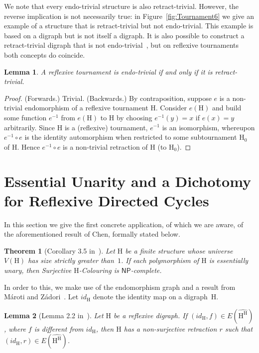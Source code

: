 \documentclass[a4paper,12pt]{article}
\newtheorem{lemma}{Lemma}
\newtheorem{theorem}{Theorem}
\theoremstyle{remark}
\newcommand{\NP}[0]{\ensuremath{\mathsf{NP}}}
\renewcommand{\H}{\ensuremath{\mathrm{H}}}
\begin{document}
We note that every endo-trivial structure is also retract-trivial. However, the reverse implication is not necessarily true: 
in Figure~\ref{fig:Tournament6} we give an example of a structure that is retract-trivial but not endo-trivial.
This example is based on a digraph but is not itself a digraph. It is also possible to construct a retract-trivial digraph that is not endo-trivial~\cite{Si17}, but
on reflexive tournaments both concepts do coincide.

\begin{lemma}
A reflexive tournament is endo-trivial if and only if it is retract-trivial.
\label{lem:endo-retraction-trivial}
\end{lemma}

\begin{proof}
(Forwards.) Trivial.
(Backwards.) By contraposition, suppose $e$ is a non-trivial endomorphism of a reflexive tournament $\H$. Consider $e(\H)$ and build some function $e^{-1}$ from $e(\H)$ to $\H$ by choosing $e^{-1}(y)=x$ if $e(x)=y$ arbitrarily. Since $\H$ is a (reflexive) tournament, $e^{-1}$ is an isomorphism, whereupon $e^{-1} \circ e$ is the identity automorphism when restricted to some subtournament $\H_0$ of $\H$. Hence $e^{-1} \circ e$ is a non-trivial retraction of $\H$ (to $\H_0$).
\end{proof}

\section{Essential Unarity and a Dichotomy for Reflexive Directed Cycles}\label{sec:Benoit}

In this section we give the first concrete application, of which we are aware, of the aforementioned result of Chen, formally stated below.

\begin{theorem}[Corollary 3.5 in~\cite{ChenSurHom}]
Let $\H$ be a finite structure whose universe $V(\H)$ has size strictly greater than~$1$. If each
polymorphism of $\H$ is essentially unary, then {\sc Surjective $\H$-Colouring}
is \NP-complete.
\label{thm:Chen-hauptsatz}
\end{theorem}

In order to this, we make use of the endomorphism graph and a result from M\'aroti and Z\'adori~\cite{marzad}.
Let $id_\H$ denote the identity map on a digraph~$\H$.

\begin{lemma}[Lemma 2.2 in~\cite{marzad}] Let $\H$ be a reflexive digraph. If $(id_\H,f) \in E(\widehat{\H^\H})$, where $f$ is different from
$id_\H$, then $\H$ has a
non-surjective retraction $r$ 
 such that $(id_\H,r)\in E(\widehat{\H^{\H}})$.
\label{lem:marzad}
\end{lemma}
\end{document}
